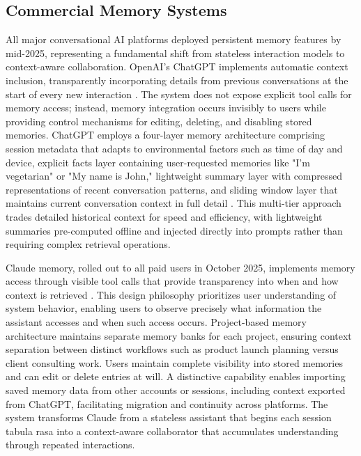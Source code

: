 \subsection{Commercial Memory Systems}

All major conversational AI platforms deployed persistent memory features by mid-2025, representing a fundamental shift from stateless interaction models to context-aware collaboration. OpenAI's ChatGPT implements automatic context inclusion, transparently incorporating details from previous conversations at the start of every new interaction \citep{openai2024memory}. The system does not expose explicit tool calls for memory access; instead, memory integration occurs invisibly to users while providing control mechanisms for editing, deleting, and disabling stored memories. ChatGPT employs a four-layer memory architecture comprising session metadata that adapts to environmental factors such as time of day and device, explicit facts layer containing user-requested memories like "I'm vegetarian" or "My name is John," lightweight summary layer with compressed representations of recent conversation patterns, and sliding window layer that maintains current conversation context in full detail \citep{greyling2024chatgpt}. This multi-tier approach trades detailed historical context for speed and efficiency, with lightweight summaries pre-computed offline and injected directly into prompts rather than requiring complex retrieval operations.

Claude memory, rolled out to all paid users in October 2025, implements memory access through visible tool calls that provide transparency into when and how context is retrieved \citep{anthropic2025memory}. This design philosophy prioritizes user understanding of system behavior, enabling users to observe precisely what information the assistant accesses and when such access occurs. Project-based memory architecture maintains separate memory banks for each project, ensuring context separation between distinct workflows such as product launch planning versus client consulting work. Users maintain complete visibility into stored memories and can edit or delete entries at will. A distinctive capability enables importing saved memory data from other accounts or sessions, including context exported from ChatGPT, facilitating migration and continuity across platforms. The system transforms Claude from a stateless assistant that begins each session tabula rasa into a context-aware collaborator that accumulates understanding through repeated interactions.

